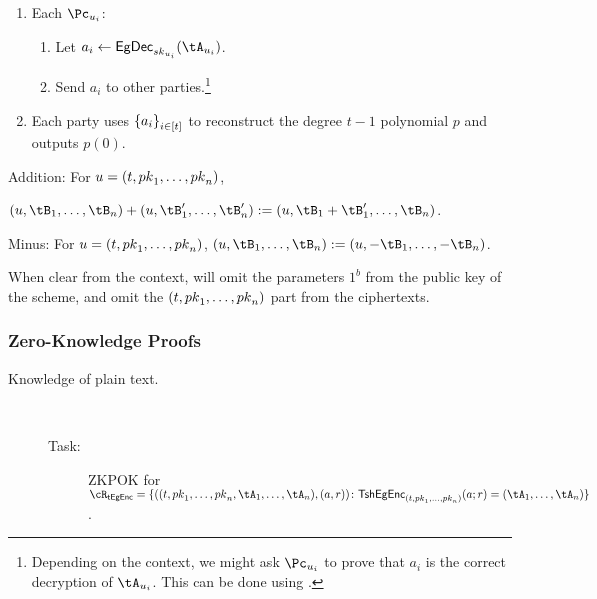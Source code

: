 {\begin{algorithm}
	\begin{enumerate}
		\item 	Each $\Pc_{u_i}$:
		
		\begin{enumerate}
			\item Let  $a_i \asn \EgDec_{\sk_{u_i}} (\tA_{u_i})$.
			
			\item  Send $a_i$ to other parties.\footnote{Depending on the context, we might ask $\Pc_{u_i}$ to prove that $a_i$ is  the correct decryption of $\tA_{u_i}$. This can be  done using   \piZKPOK{\rEgConsSk}.}
		\end{enumerate} 
		
		\item Each party uses $\set{a_i}_{i\in [t]}$ to reconstruct 	the degree $t-1$ polynomial $p$ and  outputs $p(0)$.
		
		
	\end{enumerate}
	
	\item[Addition:] For $u = (t,{pk}_1,\ldots,{pk}_n)$, 
	
	$(u,\tB_1,\ldots,\tB_n) + (u,\tB_1',\ldots,\tB_n') \eqdef (u,\tB_1+\tB_1',\ldots,\tB_n)$.
	
	
	\item[Minus:]  For $u = (t,{pk}_1,\ldots,{pk}_n)$,  $(u,\tB_1,\ldots,\tB_n) \eqdef (u,-\tB_1,\ldots,-\tB_n) $.
	
\end{algorithm}	
When clear from the context,  will omit the parameters $1^b$ from the public key of the scheme, and omit the  $(t,{pk}_1,\ldots,{pk}_n)$ part  from the ciphertexts.


\newcommand{\TsEgEncs}{{{\sf tEgEnc}}}
\newcommand{\rTsEgEnc}{\cR_\TsEgEncs}
\newcommand{\rTsEgEncDef}
{
	\sset{((t,\pk_1,\ldots,\pk_n,\tA_1,\ldots,\tA_n),(a,r))\colon \tsEgEnc_{(t,\pk_1,\ldots,\pk_n)}(a;r)= (\tA_1,\ldots,\tA_n)}
}



\subsubsection{Zero-Knowledge Proofs}\label{sec:ChanksEg:tsEGinExp:ZK}


\begin{description}




\item[Knowledge of plain text.] ~

\begin{description}
	\item[Task:] ZKPOK for  $\rTsEgEnc=\rTsEgEncDef$.
	

\end{description}
\end{description}}

